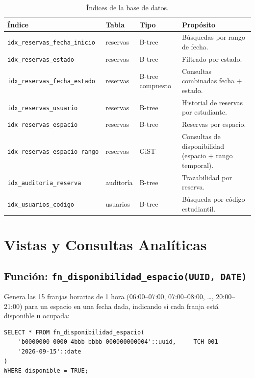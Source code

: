 \documentclass[12pt, a4paper]{article}
\begin{document}
\begin{table}[H]
\centering
\renewcommand{\arraystretch}{1.3}
\begin{tabularx}{\textwidth}{l l l X}
    \toprule
    \textbf{Índice} & \textbf{Tabla} & \textbf{Tipo} & \textbf{Propósito} \\
    \midrule
    \texttt{idx\_reservas\_fecha\_inicio} & reservas & B-tree & Búsquedas por rango de fecha. \\
    \texttt{idx\_reservas\_estado} & reservas & B-tree & Filtrado por estado. \\
    \texttt{idx\_reservas\_fecha\_estado} & reservas & B-tree compuesto & Consultas combinadas fecha + estado. \\
    \texttt{idx\_reservas\_usuario} & reservas & B-tree & Historial de reservas por estudiante. \\
    \texttt{idx\_reservas\_espacio} & reservas & B-tree & Reservas por espacio. \\
    \texttt{idx\_reservas\_espacio\_rango} & reservas & GiST & Consultas de disponibilidad (espacio + rango temporal). \\
    \texttt{idx\_auditoria\_reserva} & auditoría & B-tree & Trazabilidad por reserva. \\
    \texttt{idx\_usuarios\_codigo} & usuarios & B-tree & Búsqueda por código estudiantil. \\
    \bottomrule
\end{tabularx}
\caption{Índices de la base de datos.}
\end{table}


\section{Vistas y Consultas Analíticas}

\subsection{Función: \texttt{fn\_disponibilidad\_espacio(UUID, DATE)}}

Genera las 15 franjas horarias de 1 hora (06:00--07:00, 07:00--08:00, \ldots, 20:00--21:00) para un espacio en una fecha dada, indicando si cada franja está disponible u ocupada:

\begin{lstlisting}[caption={Función de disponibilidad de franjas horarias.}]
SELECT * FROM fn_disponibilidad_espacio(
    'b0000000-0000-4bbb-bbbb-000000000004'::uuid,  -- TCH-001
    '2026-09-15'::date
)
WHERE disponible = TRUE;
\end{lstlisting}
\end{document}
